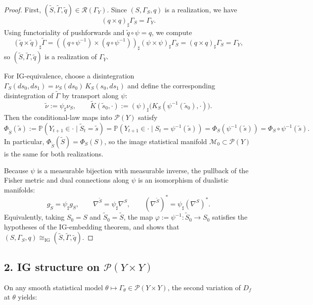 \documentclass[11pt]{article}
\newcommand{\Pcal}{\mathcal{P}}
\begin{document}
\begin{proof}
First, $(\tilde S,\tilde\Gamma,\tilde q)\in\mathcal R(\Gamma_Y)$.
Since $(S,\Gamma_S,q)$ is a realization, we have
\[
  (q\times q)_\sharp \Gamma_S = \Gamma_Y.
\]
Using functoriality of pushforwards and $\tilde q\circ\psi = q$, we compute
\[
  (\tilde q\times\tilde q)_\sharp \tilde\Gamma
  = ( (q\circ\psi^{-1}) \times (q\circ\psi^{-1}) )_\sharp
    (\psi\times\psi)_\sharp \Gamma_S
  = (q\times q)_\sharp \Gamma_S
  = \Gamma_Y,
\]
so $(\tilde S,\tilde\Gamma,\tilde q)$ is a realization of $\Gamma_Y$.

For IG-equivalence, choose a disintegration
$\Gamma_S(ds_0,ds_1)=\nu_S(ds_0)\,K_S(s_0,ds_1)$ and define the
corresponding disintegration of $\tilde\Gamma$ by transport along $\psi$:
\[
  \tilde\nu := \psi_\sharp\nu_S, \qquad
  \tilde K(\tilde s_0,\cdot)
  := (\psi)_\sharp\bigl(K_S(\psi^{-1}(\tilde s_0),\cdot)\bigr).
\]
Then the conditional-law maps into $\Pcal(Y)$ satisfy
\[
  \Phi_{\tilde S}(\tilde s)
  := \mathbb P(Y_{t+1}\in\cdot \mid \tilde S_t=\tilde s)
  = \mathbb P(Y_{t+1}\in\cdot \mid S_t=\psi^{-1}(\tilde s))
  = \Phi_S(\psi^{-1}(\tilde s))
  = \Phi_S\circ\psi^{-1}(\tilde s).
\]
In particular, $\Phi_{\tilde S}(\tilde S)=\Phi_S(S)$, so the image statistical
manifold $\mathcal M_0\subset\Pcal(Y)$ is the same for both realizations.

Because $\psi$ is a measurable bijection with measurable inverse, the pullback
of the Fisher metric and dual connections along $\psi$ is an isomorphism of
dualistic manifolds:
\[
  g_{\tilde S} = \psi_\sharp g_S, \qquad
  \nabla^{\tilde S} = \psi_\sharp \nabla^S,
  \qquad
  (\nabla^{\tilde S})^\ast = \psi_\sharp (\nabla^S)^\ast.
\]
Equivalently, taking $S_0=S$ and $\tilde S_0=\tilde S$, the map
$\varphi := \psi^{-1}:\tilde S_0\to S_0$ satisfies the hypotheses of the
IG-embedding theorem, and shows that
$(S,\Gamma_S,q)\cong_{\mathrm{IG}}(\tilde S,\tilde\Gamma,\tilde q)$.
\end{proof}

\subsection*{2. IG structure on $\Pcal(Y\times Y)$}

On any smooth statistical model
$\theta\mapsto \Gamma_\theta\in\Pcal(Y\times Y)$, the second variation of
$D_f$ at $\theta$ yields:
\end{document}
